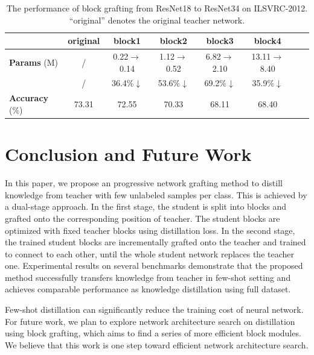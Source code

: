 \documentclass[letterpaper]{article} %
\begin{document}
{{{            \begin{table}[h]
            \centering
            \resizebox{\linewidth}{!}
            {
            \begin{tabular}{lccccccc}
            \hline
            \toprule
            & \textbf{original}    & \textbf{block1}    & \textbf{block2}   & \textbf{block3}  & \textbf{block4} \\
            \hline
            \textbf{Params} (M) &  / & 0.22$\rightarrow$0.14 & 1.12$\rightarrow$0.52 & 6.82$\rightarrow$2.10 & 13.11$\rightarrow$8.40\\
            &  / & 36.4\%$\downarrow$ & 53.6\%$\downarrow$ & 69.2\%$\downarrow$ & 35.9\%$\downarrow$ \\
            \hline
            \textbf{Accuracy} (\%) & 73.31             & 72.55              &  70.33            &  68.11          & 68.40  \\
            \bottomrule
            \end{tabular}
            }

            \caption{The performance of block grafting from ResNet18 to ResNet34 on ILSVRC-2012.
            ``original'' denotes the original teacher network.
                    }
            \label{table:partial}
            \end{table}
        }
    }

}

\section{Conclusion and Future Work}
{
    In this paper, we propose an progressive network grafting method to distill knowledge from teacher with few unlabeled samples per class.
    This is achieved by a dual-stage approach.
    In the first stage, the student is split into blocks and grafted onto the corresponding position of teacher.
    The student blocks are optimized with fixed teacher blocks using distillation loss.
    In the second stage, the trained student blocks are incrementally grafted onto the teacher and trained to connect to each other, until the whole student network replaces the teacher one.
    Experimental results on several benchmarks demonstrate that the proposed method successfully transfers knowledge from teacher in few-shot setting and achieves comparable performance as knowledge distillation using full dataset.

    Few-shot distillation can significantly reduce the training cost of neural network.
    For future work, we plan to explore network architecture search on distillation using block grafting, which aims to find a series of more efficient block modules.
    We believe that this work is one step toward efficient network architecture search.

}
\end{document}

